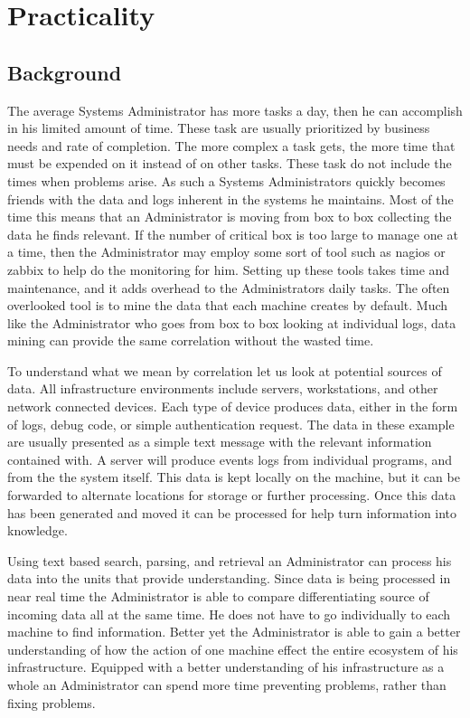 \documentclass{acm_proc_article-sp}
\begin{document}
\section{Practicality}
\subsection{Background}
The average Systems Administrator has more tasks a day, then he can accomplish in his limited amount of time.  These task are usually prioritized by business needs and rate of completion.  The more complex a task gets, the more time that must be expended on it instead of on other tasks.  These task do not include the times when problems arise.  As such a Systems Administrators quickly becomes friends with the data and logs inherent in the systems he maintains.  Most of the time this means that an Administrator is moving from box to box collecting the data he finds relevant. If the number of critical box is too large to manage one at a time, then the Administrator may employ some sort of tool such as nagios or zabbix to help do the monitoring for him. Setting up these tools takes time and maintenance, and it adds overhead to the Administrators daily tasks.  The often overlooked tool is to mine the data that each machine creates by default.  Much like the Administrator who goes from box to box looking at individual logs, data mining can provide the same correlation without the wasted time.

To understand what we mean by correlation let us look at potential sources of data.  All infrastructure environments include servers, workstations, and other network connected devices.  Each type of device produces data, either in the form of logs, debug code, or simple authentication request.  The data in these example are usually presented as a simple text message with the relevant information contained with.  A server will produce events logs from individual programs, and from the the system itself.  This data is kept locally on the machine, but it can be forwarded to alternate locations for storage or further processing.  Once this data has been generated and moved it can be processed for help turn information into knowledge. 

Using text based search, parsing, and retrieval an Administrator can process his data into the units that provide understanding.  Since data is being processed in near real time the Administrator is able to compare differentiating source of incoming data all at the same time.  He does not have to go individually to each machine to find information.  Better yet the Administrator is able to gain a better understanding of how the action of one machine effect the entire ecosystem of his infrastructure.  Equipped with a better understanding of his infrastructure as a whole an Administrator can spend more time preventing problems, rather than fixing problems.
\end{document}
